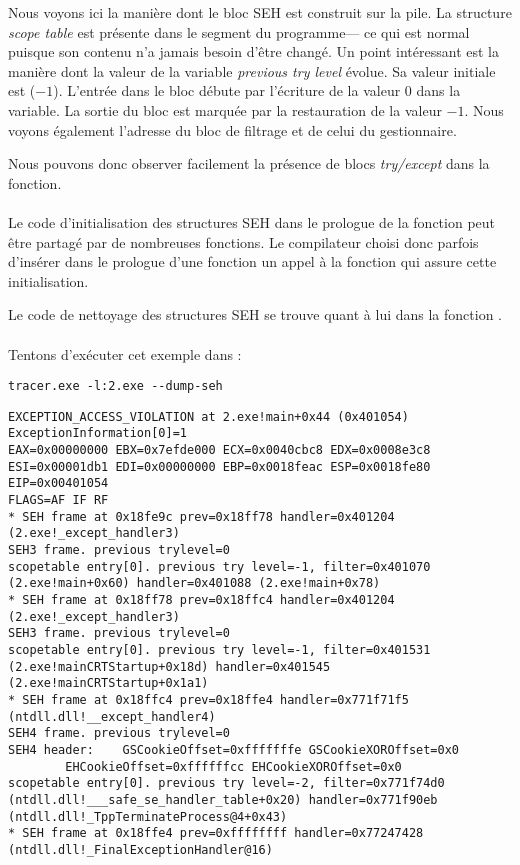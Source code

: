 



Nous voyons ici la manière dont le bloc SEH est construit sur la pile.
La structure \emph{scope table} est présente dans le segment  du programme--- ce qui est
normal puisque son contenu n'a jamais besoin d'être changé.
Un point intéressant est la manière dont la valeur de la variable \emph{previous try level} évolue.
Sa valeur initiale est  ($-1$).
L'entrée dans le bloc  débute par l'écriture de la valeur 0 dans la variable.
La sortie du bloc  est marquée par la restauration de la valeur $-1$.
Nous voyons également l'adresse du bloc de filtrage et de celui du gestionnaire.

Nous pouvons donc observer facilement la présence de blocs \emph{try/except} dans la fonction.\\
\\
Le code d'initialisation des structures SEH dans le prologue de la fonction peut être partagé par
de nombreuses fonctions. Le compilateur choisi donc parfois d'insérer dans le prologue d'une fonction
un appel à la fonction  qui assure cette initialisation.

Le code de nettoyage des structures SEH se trouve quant à lui dans la fonction .\\
\\
Tentons d'exécuter cet exemple dans \tracer{}:

\begin{lstlisting}
tracer.exe -l:2.exe --dump-seh
\end{lstlisting}

\begin{lstlisting}[caption=tracer.exe output]
EXCEPTION_ACCESS_VIOLATION at 2.exe!main+0x44 (0x401054) ExceptionInformation[0]=1
EAX=0x00000000 EBX=0x7efde000 ECX=0x0040cbc8 EDX=0x0008e3c8
ESI=0x00001db1 EDI=0x00000000 EBP=0x0018feac ESP=0x0018fe80
EIP=0x00401054
FLAGS=AF IF RF
* SEH frame at 0x18fe9c prev=0x18ff78 handler=0x401204 (2.exe!_except_handler3)
SEH3 frame. previous trylevel=0
scopetable entry[0]. previous try level=-1, filter=0x401070 (2.exe!main+0x60) handler=0x401088 (2.exe!main+0x78)
* SEH frame at 0x18ff78 prev=0x18ffc4 handler=0x401204 (2.exe!_except_handler3)
SEH3 frame. previous trylevel=0
scopetable entry[0]. previous try level=-1, filter=0x401531 (2.exe!mainCRTStartup+0x18d) handler=0x401545 (2.exe!mainCRTStartup+0x1a1)
* SEH frame at 0x18ffc4 prev=0x18ffe4 handler=0x771f71f5 (ntdll.dll!__except_handler4)
SEH4 frame. previous trylevel=0
SEH4 header:	GSCookieOffset=0xfffffffe GSCookieXOROffset=0x0
		EHCookieOffset=0xffffffcc EHCookieXOROffset=0x0
scopetable entry[0]. previous try level=-2, filter=0x771f74d0 (ntdll.dll!___safe_se_handler_table+0x20) handler=0x771f90eb (ntdll.dll!_TppTerminateProcess@4+0x43)
* SEH frame at 0x18ffe4 prev=0xffffffff handler=0x77247428 (ntdll.dll!_FinalExceptionHandler@16)
\end{lstlisting}

